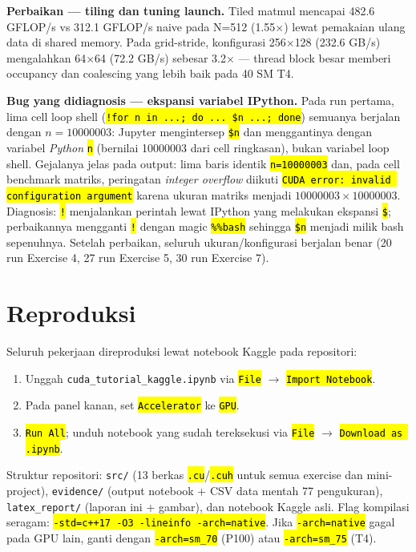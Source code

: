 \documentclass[11pt,a4paper]{article}
\newcommand{\cmd}[1]{\hl{\texttt{#1}}}
\begin{document}
\textbf{Perbaikan --- tiling dan tuning launch.} Tiled matmul mencapai 482.6 GFLOP/s vs 312.1 GFLOP/s naive pada N=512 (1.55$\times$) lewat pemakaian ulang data di shared memory. Pada grid-stride, konfigurasi 256$\times$128 (232.6 GB/s) mengalahkan 64$\times$64 (72.2 GB/s) sebesar 3.2$\times$ --- thread block besar memberi occupancy dan coalescing yang lebih baik pada 40 SM T4.

\textbf{Bug yang didiagnosis --- ekspansi variabel IPython.} Pada run pertama, lima cell loop shell (\cmd{!for n in ...; do ... \$n ...; done}) semuanya berjalan dengan $n=10000003$: Jupyter mengintersep \cmd{\$n} dan menggantinya dengan variabel \emph{Python} \cmd{n} (bernilai 10000003 dari cell ringkasan), bukan variabel loop shell. Gejalanya jelas pada output: lima baris identik \cmd{n=10000003} dan, pada cell benchmark matriks, peringatan \emph{integer overflow} diikuti \cmd{CUDA error: invalid configuration argument} karena ukuran matriks menjadi $10000003 \times 10000003$. Diagnosis: \cmd{!} menjalankan perintah lewat IPython yang melakukan ekspansi \cmd{\$}; perbaikannya mengganti \cmd{!} dengan magic \cmd{\%\%bash} sehingga \cmd{\$n} menjadi milik bash sepenuhnya. Setelah perbaikan, seluruh ukuran/konfigurasi berjalan benar (20 run Exercise 4, 27 run Exercise 5, 30 run Exercise 7).

\section{Reproduksi}
Seluruh pekerjaan direproduksi lewat notebook Kaggle pada repositori:
\begin{enumerate}
\item Unggah \texttt{cuda\_tutorial\_kaggle.ipynb} via \cmd{File} $\rightarrow$ \cmd{Import Notebook}.
\item Pada panel kanan, set \cmd{Accelerator} ke \cmd{GPU}.
\item \cmd{Run All}; unduh notebook yang sudah tereksekusi via \cmd{File} $\rightarrow$ \cmd{Download as .ipynb}.
\end{enumerate}
Struktur repositori: \texttt{src/} (13 berkas \cmd{.cu}/\cmd{.cuh} untuk semua exercise dan mini-project), \texttt{evidence/} (output notebook + CSV data mentah 77 pengukuran), \texttt{latex\_report/} (laporan ini + gambar), dan notebook Kaggle asli. Flag kompilasi seragam: \cmd{-std=c++17 -O3 -lineinfo -arch=native}. Jika \cmd{-arch=native} gagal pada GPU lain, ganti dengan \cmd{-arch=sm\_70} (P100) atau \cmd{-arch=sm\_75} (T4).
\end{document}
